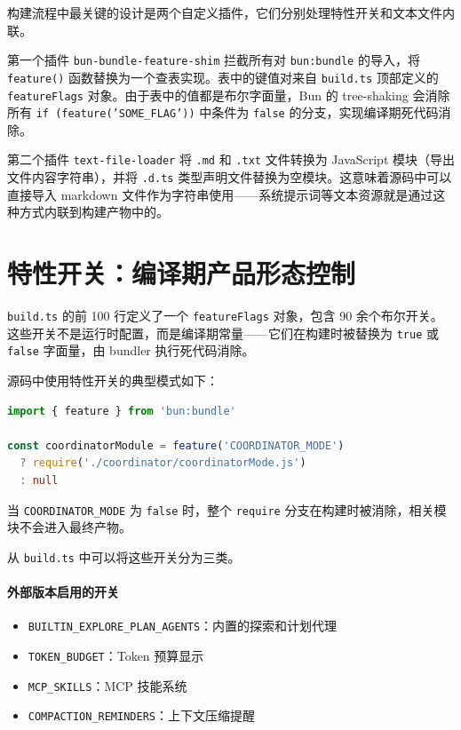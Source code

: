 构建流程中最关键的设计是两个自定义插件，它们分别处理特性开关和文本文件内联。

第一个插件 \texttt{bun-bundle-feature-shim} 拦截所有对 \texttt{bun:bundle} 的导入，将 \texttt{feature()} 函数替换为一个查表实现。表中的键值对来自 \texttt{build.ts} 顶部定义的 \texttt{featureFlags} 对象。由于表中的值都是布尔字面量，Bun 的 tree-shaking 会消除所有 \texttt{if (feature('SOME\_FLAG'))} 中条件为 \texttt{false} 的分支，实现编译期死代码消除。

第二个插件 \texttt{text-file-loader} 将 \texttt{.md} 和 \texttt{.txt} 文件转换为 JavaScript 模块（导出文件内容字符串），并将 \texttt{.d.ts} 类型声明文件替换为空模块。这意味着源码中可以直接导入 markdown 文件作为字符串使用——系统提示词等文本资源就是通过这种方式内联到构建产物中的。

\section{特性开关：编译期产品形态控制}

\texttt{build.ts} 的前 100 行定义了一个 \texttt{featureFlags} 对象，包含 90 余个布尔开关。这些开关不是运行时配置，而是编译期常量——它们在构建时被替换为 \texttt{true} 或 \texttt{false} 字面量，由 bundler 执行死代码消除。

源码中使用特性开关的典型模式如下：

\begin{lstlisting}[language=TypeScript]
import { feature } from 'bun:bundle'

const coordinatorModule = feature('COORDINATOR_MODE')
  ? require('./coordinator/coordinatorMode.js')
  : null
\end{lstlisting}

当 \texttt{COORDINATOR\_MODE} 为 \texttt{false} 时，整个 \texttt{require} 分支在构建时被消除，相关模块不会进入最终产物。

从 \texttt{build.ts} 中可以将这些开关分为三类。

\paragraph{外部版本启用的开关}

\begin{itemize}
  \item \texttt{BUILTIN\_EXPLORE\_PLAN\_AGENTS}：内置的探索和计划代理
  \item \texttt{TOKEN\_BUDGET}：Token 预算显示
  \item \texttt{MCP\_SKILLS}：MCP 技能系统
  \item \texttt{COMPACTION\_REMINDERS}：上下文压缩提醒
\end{itemize}

